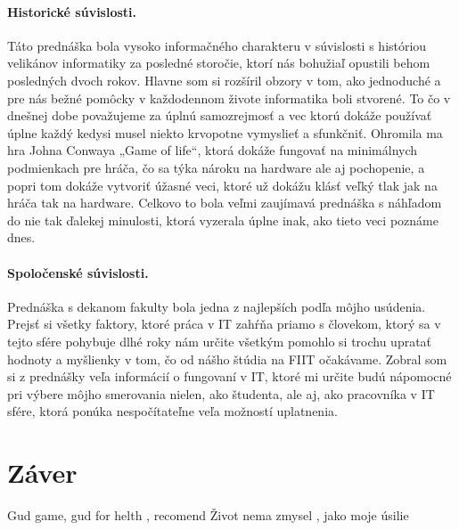 \documentclass[10pt,twoside,slovak,a4paper]{article}										%
\begin{document}
\paragraph{Historické súvislosti.} 
Táto prednáška bola vysoko informačného charakteru v súvislosti s históriou velikánov informatiky za posledné storočie, ktorí nás bohužiaľ opustili behom posledných dvoch rokov. Hlavne som si rozšíril obzory v tom, ako jednoduché a pre nás bežné pomôcky v každodennom živote informatika boli stvorené. To čo v dnešnej dobe považujeme za úplnú samozrejmosť a vec ktorú dokáže používať úplne každý kedysi musel niekto krvopotne vymyslieť a sfunkčniť. Ohromila ma hra Johna Conwaya „Game of life“, ktorá dokáže fungovať na minimálnych podmienkach pre hráča, čo sa týka nároku na hardware ale aj pochopenie, a popri tom dokáže vytvoriť úžasné veci, ktoré už dokážu klásť veľký tlak jak na hráča tak na hardware. Celkovo to bola veľmi zaujímavá prednáška s náhľadom do nie tak ďalekej minulosti, ktorá vyzerala úplne inak, ako tieto veci poznáme dnes. ~\cite{sedem:zdroj}


\paragraph{Spoločenské súvislosti.} 
Prednáška s dekanom fakulty bola jedna z najlepších podľa môjho usúdenia. Prejsť si všetky faktory, ktoré práca v IT zahŕňa priamo s človekom, ktorý sa v tejto sfére pohybuje dlhé roky nám určite všetkým pomohlo si trochu upratať hodnoty a myšlienky v tom, čo od nášho štúdia na FIIT očakávame. Zobral som si z prednášky veľa informácií o fungovaní v IT, ktoré mi určite budú nápomocné pri výbere môjho smerovania nielen, ako študenta, ale aj, ako pracovníka v IT sfére, ktorá ponúka nespočítateľne veľa možností uplatnenia.~\cite{naco:zdroj}

\section{Záver} \label{zaver}

Gud game, gud for helth , recomend 
Život nema zmysel , jako moje úsilie






 
\end{document}
